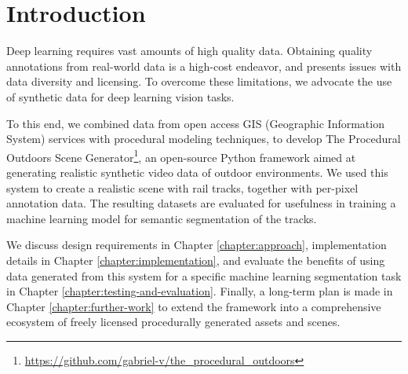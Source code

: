 \chapter{Introduction}
\label{chapter:intro}

Deep learning requires vast amounts of high quality data\cite{korakakis2018short}. Obtaining quality annotations from real-world data is a high-cost endeavor, and presents issues with data diversity and licensing\cite{asano2021pass}. To overcome these limitations, we advocate the use of synthetic data for deep learning vision tasks.

To this end, we combined data from open access GIS (Geographic Information System) services with procedural modeling techniques, to develop The Procedural Outdoors Scene Generator\footnote{\url{https://github.com/gabriel-v/the_procedural_outdoors}}, an open-source Python framework aimed at generating realistic synthetic video data of outdoor environments. We used this system to create a realistic scene with rail tracks, together with per-pixel annotation data. The resulting datasets are evaluated for usefulness in training a machine learning model for semantic segmentation of the tracks.

We discuss design requirements in Chapter \ref{chapter:approach}, implementation details in Chapter \ref{chapter:implementation}, and evaluate the benefits of using data generated from this system for a specific machine learning segmentation task in Chapter \ref{chapter:testing-and-evaluation}. Finally, a long-term plan is made in Chapter \ref{chapter:further-work} to extend the framework into a comprehensive ecosystem of freely licensed procedurally generated assets and scenes.